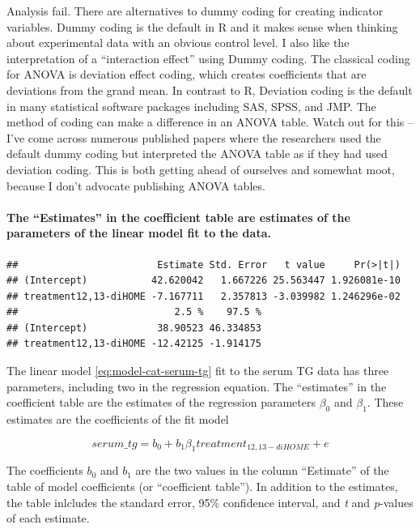 \documentclass[]{book}
\let\oldparagraph\paragraph
\renewcommand{\paragraph}[1]{\oldparagraph{#1}\mbox{}}
\begin{document}
Analysis fail. There are alternatives to dummy coding for creating indicator variables. Dummy coding is the default in R and it makes sense when thinking about experimental data with an obvious control level. I also like the interpretation of a ``interaction effect'' using Dummy coding. The classical coding for ANOVA is deviation effect coding, which creates coefficients that are deviations from the grand mean. In contrast to R, Deviation coding is the default in many statistical software packages including SAS, SPSS, and JMP. The method of coding can make a difference in an ANOVA table. Watch out for this -- I've come across numerous published papers where the researchers used the default dummy coding but interpreted the ANOVA table as if they had used deviation coding. This is both getting ahead of ourselves and somewhat moot, because I don't advocate publishing ANOVA tables.

\hypertarget{the-estimates-in-the-coefficient-table-are-estimates-of-the-parameters-of-the-linear-model-fit-to-the-data.}{%
\paragraph{The ``Estimates'' in the coefficient table are estimates of the parameters of the linear model fit to the data.}\label{the-estimates-in-the-coefficient-table-are-estimates-of-the-parameters-of-the-linear-model-fit-to-the-data.}}

\begin{verbatim}
##                        Estimate Std. Error   t value     Pr(>|t|)
## (Intercept)           42.620042   1.667226 25.563447 1.926081e-10
## treatment12,13-diHOME -7.167711   2.357813 -3.039982 1.246296e-02
##                           2.5 %    97.5 %
## (Intercept)            38.90523 46.334853
## treatment12,13-diHOME -12.42125 -1.914175
\end{verbatim}

The linear model \eqref{eq:model-cat-serum-tg} fit to the serum TG data has three parameters, including two in the regression equation. The ``estimates'' in the coefficient table are the estimates of the regression parameters \(\beta_0\) and \(\beta_1\). These estimates are the coefficients of the fit model

\begin{equation}
serum\_tg = b_0 + b_1 \beta_1 treatment_{12,13-diHOME} + e
\label{eq:fit-serum-tg}
\end{equation}

The coefficients \(b_0\) and \(b_1\) are the two values in the column ``Estimate'' of the table of model coefficients (or ``coefficient table''). In addition to the estimates, the table inlcludes the standard error, 95\% confidence interval, and \emph{t} and \emph{p}-values of each estimate.
\end{document}
